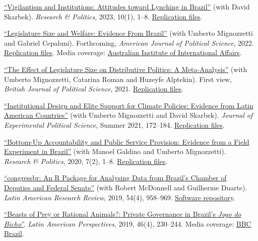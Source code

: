 \documentclass[a4paper]{article}
\renewenvironment{itemize}{
	\begin{list}{}{
			\setlength{\leftmargin}{1.5em}
		}
		}{
	\end{list}
}
\begin{document}
\begin{itemize}
\item \href{https://doi.org/10.1177/20531680221150389}{``Vigilantism and Institutions: Attitudes toward Lynching in Brazil''} (with David Skarbek). \textit{Research \& Politics}, 2023, 10(1), 1--8. \href{https://github.com/danilofreire/lynching-experiment-brazil}{Replication files}.
\item \href{https://doi.org/10.1111/ajps.12843}{``Legislature Size and Welfare: Evidence From Brazil''} (with Umberto Mignozzetti and Gabriel Cepaluni). Forthcoming, \textit{American Journal of Political Science}, 2022. \href{https://github.com/umbertomig/legislature-size-welfare}{Replication files}. Media coverage: \href{https://www.internationalaffairs.org.au/australianoutlook/legislature-size-and-welfare-evidence-from-brazil/}{Australian Institute of International Affairs}.
\item \href{https://doi.org/10.1017/S0007123422000552}{``The Effect of Legislature Size on Distributive Politics: A Meta-Analysis''} (with Umberto Mignozzetti, Catarina Roman and Huzeyfe Alptekin). First view, \textit{British Journal of Political Science}, 2021. \href{https://github.com/danilofreire/legislature-size-meta-analysis}{Replication files}.
\item \href{http://dx.doi.org/10.1017/XPS.2020.19}{``Institutional Design and Elite Support for Climate Policies: Evidence from Latin American Countries''} (with Umberto Mignozzetti and David Skarbek). \textit{Journal of Experimental Political Science}, Summer 2021, 172--184. \href{https://doi.org/10.7910/DVN/VTA5OA}{Replication files}.
\item \href{https://doi.org/10.1177%2F2053168020914444}{``Bottom-Up Accountability and Public Service Provision: Evidence from a Field Experiment in Brazil''} (with Manoel Galdino and Umberto Mignozzetti). \textit{Research \& Politics}, 2020, 7(2), 1--8. \href{https://github.com/umbertomig/tdp-accountability}{Replication files}.
\item \href{https://doi.org/10.25222/larr.447}{``congressbr: An R Package for Analysing Data from Brazil's Chamber of Deputies and Federal Senate''} (with Robert McDonnell and Guilherme Duarte). \textit{Latin American Research Review}, 2019, 54(4), 958--969. \href{https://github.com/duarteguilherme/congressbr}{Software repository}.
\item \href{https://doi.org/10.1177/0094582X19846519}{``Beasts of Prey or Rational Animals?: Private Governance in Brazil's \emph{Jogo do Bicho}''}. \textit{Latin American Perspectives}, 2019, 46(4), 230--244. Media coverage: \href{http://www.bbc.com/portuguese/brasil-40140693}{BBC Brazil}.

\end{itemize}
\end{document}
